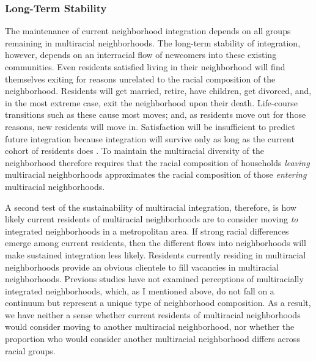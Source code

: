 \documentclass{baderart}
\begin{document}
\subsubsection{Long-Term Stability}\label{long-term-stability}

The maintenance of current neighborhood integration depends on all groups remaining in multiracial neighborhoods. The long-term stability of integration, however, depends on an interracial flow of newcomers into these existing communities. Even residents satisfied living in their neighborhood will find themselves exiting for reasons unrelated to the racial composition of the neighborhood. Residents will get married, retire, have children, get divorced, and, in the most extreme case, exit the neighborhood upon their death. Life-course transitions such as these cause most moves; and, as residents move out for those reasons, new residents will move in. Satisfaction will be insufficient to predict future integration because integration will survive only as long as the current cohort of residents does \citep[see, e.g., ][]{molotch_racial_1969, woldoff_white_2011}. To maintain the multiracial diversity of the neighborhood therefore requires that the racial composition of households \emph{leaving} multiracial neighborhoods approximates the racial composition of those \emph{entering} multiracial neighborhoods.

A second test of the sustainability of multiracial integration, therefore, is how likely current residents of multiracial neighborhoods are to consider moving \emph{to} integrated neighborhoods in a metropolitan area. If strong racial differences emerge among current residents, then the different flows into neighborhoods will make sustained integration less likely. Residents currently residing in multiracial neighborhoods provide an obvious clientele to fill vacancies in multiracial neighborhoods. Previous studies have not examined perceptions of multiracially integrated neighborhoods, which, as I mentioned above, do not fall on a continuum but represent a unique type of neighborhood composition. As a result, we have neither a sense whether current residents of multiracial neighborhoods would consider moving to another multiracial neighborhood, nor whether the proportion who would consider another multiracial neighborhood differs across racial groups.
\end{document}
